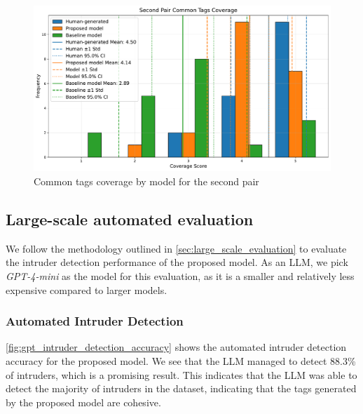 \begin{figure}[h]
    \centering
    \includegraphics[width=1\textwidth]{figures/second_pair_common_tags_coverage_comparison.pdf}
    \caption{Common tags coverage by model for the second pair}
    \label{fig:second_pair_common_tags_coverage_comparison}
\end{figure}



\subsection{Large-scale automated evaluation}
We follow the methodology outlined in \cref{sec:large_scale_evaluation} to evaluate the intruder detection performance of the proposed model. As an LLM, we pick \textit{GPT-4-mini} as the model for this evaluation, as it is a smaller and relatively less expensive compared to larger models.

\subsubsection{Automated Intruder Detection}
\cref{fig:gpt_intruder_detection_accuracy} shows the automated intruder detection accuracy for the proposed model. We see that the LLM managed to detect 88.3\% of intruders, which is a promising result. This indicates that the LLM was able to detect the majority of intruders in the dataset, indicating that the tags generated by the proposed model are cohesive.

